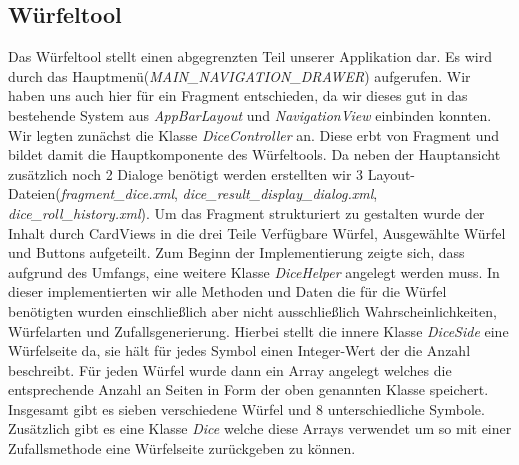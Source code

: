 \subsection{Würfeltool}
Das Würfeltool stellt einen abgegrenzten Teil unserer Applikation dar. Es wird durch das Hauptmenü(\textit{MAIN\_NAVIGATION\_DRAWER}) aufgerufen. Wir haben uns auch hier für ein Fragment entschieden, da wir dieses gut in das bestehende System aus \textit{AppBarLayout} und \textit{NavigationView} einbinden konnten. Wir legten zunächst die Klasse \textit{DiceController} an. Diese erbt von Fragment und bildet damit die Hauptkomponente des Würfeltools. Da neben der Hauptansicht zusätzlich noch 2 Dialoge benötigt werden erstellten wir 3 Layout-Dateien(\textit{fragment\_dice.xml}, \textit{dice\_result\_display\_dialog.xml}, \textit{dice\_roll\_history.xml}). Um das Fragment strukturiert zu gestalten wurde der Inhalt durch CardViews in die drei Teile \grqq Verfügbare Würfel\grqq{}, \grqq Ausgewählte Würfel\grqq{} und \grqq Buttons\grqq{} aufgeteilt. Zum Beginn der Implementierung zeigte sich, dass aufgrund des Umfangs, eine weitere Klasse \textit{DiceHelper} angelegt werden muss. In dieser implementierten wir alle Methoden und Daten die für die Würfel benötigten wurden einschließlich aber nicht ausschließlich Wahrscheinlichkeiten, Würfelarten und Zufallsgenerierung. Hierbei stellt die innere Klasse \textit{DiceSide} eine Würfelseite da, sie hält für jedes Symbol einen Integer-Wert der die Anzahl beschreibt. Für jeden Würfel wurde dann ein Array angelegt welches die entsprechende Anzahl an Seiten in Form der oben genannten Klasse speichert. Insgesamt gibt es sieben verschiedene Würfel und 8 unterschiedliche Symbole. Zusätzlich gibt es eine Klasse \textit{Dice} welche diese Arrays verwendet um so mit einer Zufallsmethode eine Würfelseite zurückgeben zu können.\\
